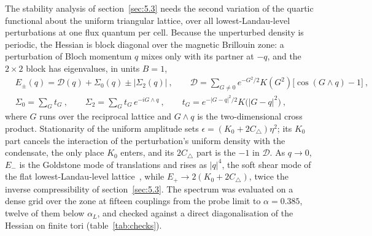 The stability analysis of section~\ref{sec:5.3} needs the second variation
of the quartic functional about the uniform triangular lattice, over all
lowest-Landau-level perturbations at one flux quantum per cell. Because the
unperturbed density is periodic, the Hessian is block diagonal over the
magnetic Brillouin zone: a perturbation of Bloch momentum $q$ mixes only
with its partner at $-q$, and the $2\times2$ block has eigenvalues, in
units $B = 1$,
\begin{equation}
\begin{split}
&E_\pm(q) = \mathcal{D}(q) + \Sigma_0(q) \pm |\Sigma_2(q)|~, \qquad
\mathcal{D} = \sum_{G\neq0}e^{-G^2/2}K(G^2)\big[\cos(G\wedge q) - 1\big]~,\\
&\Sigma_0 = \sum_G t_G~,\qquad
\Sigma_2 = \sum_G t_G\,e^{-iG\wedge q}~, \qquad
t_G = e^{-|G-q|^2/2}K\big(|G-q|^2\big)~,
\end{split}
\end{equation}
where $G$ runs over the reciprocal lattice and $G \wedge q$ is the
two-dimensional cross product. Stationarity of the uniform amplitude sets
$\epsilon = (K_0 + 2C_\triangle)\eta^2$; its $K_0$ part cancels the
interaction of the perturbation's uniform density with the condensate,
the only place $K_0$ enters, and its $2C_\triangle$ part is the $-1$ in
$\mathcal{D}$. As $q \to 0$, $E_-$ is the Goldstone mode of
translations and rises as $|q|^4$, the soft shear mode of the flat
lowest-Landau-level lattice~\cite{Eilenberger:1967zz,Rosenstein:2010rmp}, while $E_+ \to 2(K_0 + 2C_\triangle)$,
twice the inverse compressibility of section~\ref{sec:5.3}. The spectrum
was evaluated on a dense grid over the zone at fifteen couplings from the
probe limit to $\alpha = 0.385$, twelve of them below $\alpha_L$, and
checked against a direct diagonalisation of the Hessian on finite tori
(table~\ref{tab:checks}).
